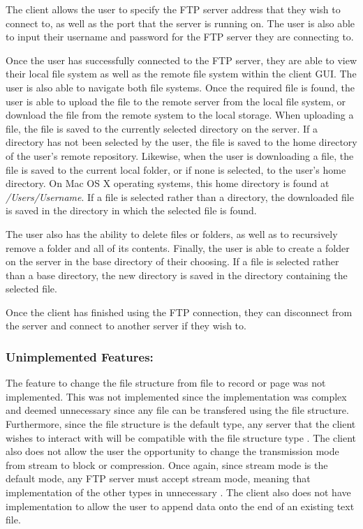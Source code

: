 \documentclass[10pt,twocolumn]{witseiepaper}
\begin{document}
The client allows the user to specify the FTP server address that they wish to connect to, as well as the port that the server is running on. The user is also able to input their username and password for the FTP server they are connecting to.

Once the user has successfully connected to the FTP server, they are able to view their local file system as well as the remote file system within the client GUI. The user is also able to navigate both file systems. Once the required file is found, the user is able to upload the file to the remote server from the local file system, or download the file from the remote system to the local storage. When uploading a file, the file is saved to the currently selected directory on the server. If a directory has not been selected by the user, the file is saved to the home directory of the user's remote repository. Likewise, when the user is downloading a file, the file is saved to the current local folder, or if none is selected, to the user's home directory. On Mac OS X operating systems, this home directory is found at \textit{/Users/Username}. If a file is selected rather than a directory, the downloaded file is saved in the directory in which the selected file is found.

The user also has the ability to delete files or folders, as well as to recursively remove a folder and all of its contents. Finally, the user is able to create a folder on the server in the base directory of their choosing. If a file is selected rather than a base directory, the new directory is saved in the directory containing the selected file.

Once the client has finished using the FTP connection, they can disconnect from the server and connect to another server if they wish to.

\subsubsection*{Unimplemented Features:}
The feature to change the file structure from file to record or page was not implemented. This was not implemented since the implementation was complex and deemed unnecessary since any file can be transfered using the file structure. Furthermore, since the file structure is the default type, any server that the client wishes to interact with will be compatible with the file structure type \cite{rfc}. The client also does not allow the user the opportunity to change the transmission mode from stream to block or compression. Once again, since stream mode is the default mode, any FTP server must accept stream mode, meaning that implementation of the other types in unnecessary \cite{rfc}. The client also does not have implementation to allow the user to append data onto the end of an existing text file.
\end{document}
